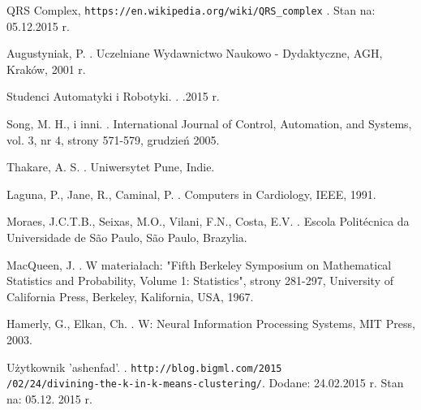 
\begin{thebibliography}{99} %

QRS Complex,
\newblock \texttt{https://en.wikipedia.org/wiki/QRS\_complex} .
\newblock Stan na: 05.12.2015 r.

Augustyniak, P.
.
\newblock Uczelniane Wydawnictwo Naukowo - Dydaktyczne, AGH, Kraków, 2001 r.

Studenci Automatyki i Robotyki.
.
.2015 r.

Song, M. H., i inni.
.
\newblock International Journal of Control, Automation, and Systems, vol. 3, nr 4, strony 571-579, grudzień 2005.

Thakare, A. S.
.
\newblock Uniwersytet Pune, Indie.

Laguna, P., Jane, R., Caminal, P.
.
\newblock Computers in Cardiology, IEEE, 1991.

Moraes, J.C.T.B., Seixas, M.O., Vilani, F.N., Costa, E.V.
.
\newblock Escola Politécnica da Universidade de São Paulo, São Paulo, Brazylia.

MacQueen, J.
.
\newblock W materiałach: "Fifth Berkeley Symposium on Mathematical Statistics and Probability, Volume 1: Statistics", strony 281-297,
\newblock University of California Press, Berkeley, Kalifornia, USA, 1967. 

Hamerly, G., Elkan, Ch.
.
\newblock W: Neural Information Processing Systems,
\newblock MIT Press, 2003.

Użytkownik 'ashenfad'.
.
\newblock \texttt{http://blog.bigml.com/2015\\/02/24/divining-the-k-in-k-means-clustering/}. 
\newblock Dodane: 24.02.2015 r.
\newblock Stan na: 05.12. 2015 r.


\end{thebibliography}
